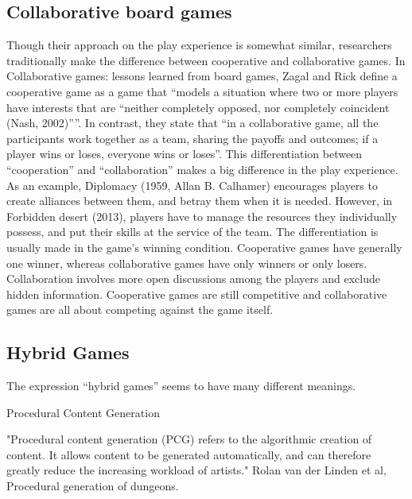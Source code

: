 \subsection{Collaborative board games}

Though their approach on the play experience is somewhat similar, researchers traditionally make the difference between cooperative and collaborative games. In Collaborative games: lessons learned from board games, Zagal and Rick define a cooperative game as a game that “models a situation where two or more players have interests that are “neither completely opposed, nor completely coincident (Nash, 2002)””. In contrast, they state that “in a collaborative game, all the participants work together as a team, sharing the payoffs and outcomes; if a player wins or loses, everyone wins or loses”. This differentiation between “cooperation” and “collaboration” makes a big difference in the play experience. As an example, Diplomacy (1959, Allan B. Calhamer) encourages players to create alliances between them, and betray them when it is needed. However, in Forbidden desert (2013), players have to manage the resources they individually possess, and put their skills at the service of the team. 
The differentiation is usually made in the game’s winning condition. Cooperative games have generally one winner, whereas collaborative games have only winners or only losers. Collaboration involves more open discussions among the players and exclude hidden information. Cooperative games are still competitive and collaborative games are all about competing against the game itself. 


\subsection{Hybrid Games}

The expression “hybrid games” seems to have many different meanings. 




Procedural Content Generation

"Procedural content generation (PCG) refers to the algorithmic creation of content. It allows content to be generated automatically, and can therefore greatly reduce the increasing workload of artists." Rolan van der Linden et al, Procedural generation of dungeons.
